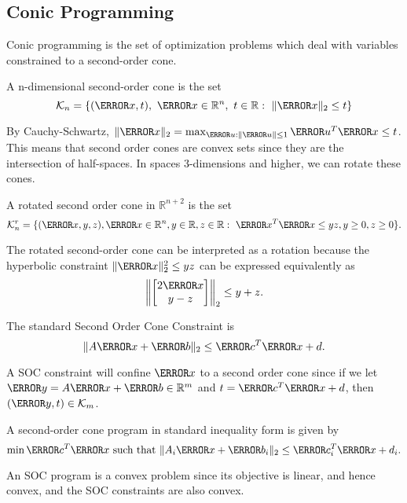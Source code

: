 \subsection{Conic Programming}
Conic programming is the set of optimization problems which deal with variables constrained to a second-order cone.
\begin{definition}
	A n-dimensional second-order cone is the set \[
		\mathcal{K}_n = \{(\V{x}, t),\ \V{x}\in\mathbb{R}^n,\ t\in\mathbb{R}:\ \|\V{x}\|_2 \leq t\}
	\]
	\label{defn:soc}
\end{definition}
By Cauchy-Schwartz, $\|\V{x}\|_2 = \max_{\V{u}:\|\V{u}\|\leq 1} \V{u}^T\V{x} \leq t$.
This means that second order cones are convex sets since they are the intersection of half-spaces.
In spaces 3-dimensions and higher, we can rotate these cones.
\begin{definition}
	A rotated second order cone in $\mathbb{R}^{n+2}$ is the set \[
		\mathcal{K}_n^r = \{(\V{x}, y, z),\V{x}\in\mathbb{R}^n, y\in\mathbb{R}, z\in\mathbb{R}:\ \V{x}^T\V{x} \leq yz, y\geq 0, z \geq 0 \}.
	\]
	\label{defn:rot-soc}
\end{definition}
The rotated second-order cone can be interpreted as a rotation because the hyperbolic constraint $\|\V{x}\|_2^2\leq yz$ can be expressed equivalently as
\[
	\left\lVert\begin{bmatrix}2\V{x} \\ y - z\end{bmatrix}\right\rVert_2 \leq y+z.
\]
\begin{definition}
	The standard Second Order Cone Constraint is \[
		\|A\V{x}+\V{b}\|_2 \leq \V{c}^T\V{x} +d.
	\]
	\label{defn:soc-const}
\end{definition}
A SOC constraint will confine $\V{x}$ to a second order cone since if we let $\V{y} = A\V{x}+\V{b} \in \mathbb{R}^m$ and $t = \V{c}^T\V{x}+d$, then $(\V{y}, t)\in\mathcal{K}_m$.
\begin{definition}
	A second-order cone program in standard inequality form is given by
	\[
		\min \V{c}^T\V{x} \text{ such that } \|A_i\V{x}+\V{b}_i\|_2 \leq \V{c}_i^T\V{x}+d_i.
	\]
	\label{defn:soc-program}
\end{definition}
An SOC program is a convex problem since its objective is linear, and hence convex, and the SOC constraints are also convex.
